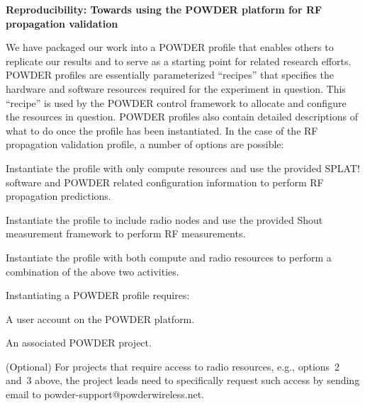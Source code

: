 \documentclass[10pt]{article}
\begin{document}

\begin{center}
  \Large\bfseries
  Reproducibility: Towards using the POWDER platform for RF propagation validation 
\end{center}

We have packaged our work into a POWDER profile that enables others to
replicate our results and to serve as a starting point for related research
efforts. POWDER profiles are essentially parameterized
``recipes'' that specifies the hardware and software resources required
for the experiment in question. This ``recipe'' is used by the POWDER
control framework to allocate and configure the resources in question. 
POWDER profiles also contain detailed descriptions of what to
do once the profile has been instantiated.
In the case of the RF propagation validation profile, a number of options
are possible:
\begin{inparaenum}[(1)]
\item Instantiate the profile with only compute resources and use the provided
SPLAT! software and POWDER related configuration information to perform 
RF propagation predictions.
\item Instantiate the profile to include radio nodes and use the provided
Shout measurement framework to perform RF measurements.
\item Instantiate the profile with both compute and radio resources to perform
a combination of the above two activities.
\end{inparaenum}

Instantiating a POWDER profile requires:
\begin{inparaenum}[(a)]
\item A user account on the POWDER platform.
\item An associated POWDER project. 
\item (Optional) For projects that require access to radio resources,
e.g., options~2 and~3 above, the project leads need to specifically request such access
by sending email to powder-support@powderwireless.net.  
\end{inparaenum}
\end{document}
